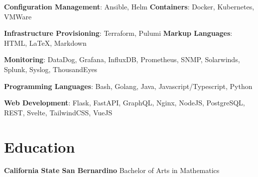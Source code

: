 \documentclass[letterpaper,11pt]{article}
\newcommand{\technicalSkill}[1]{
  \small{#1}
}
\begin{document}
  \technicalSkill{
    \textbf{Configuration Management}{: Ansible, Helm}
    \hfill
    \textbf{Containers}{: Docker, Kubernetes, VMWare}
  }

  \technicalSkill{
    \textbf{Infrastructure Provisioning}{: Terraform, Pulumi}
    \hfill
    \textbf{Markup Languages}{: HTML, {\LaTeX}, Markdown}
  }

  \technicalSkill{
    \textbf{Monitoring}{: DataDog, Grafana, InfluxDB, Prometheus, SNMP, Solarwinds, Splunk, Syslog, ThousandEyes}
  }

  \technicalSkill{
    \textbf{Programming Languages}{: Bash, Golang, Java, Javascript/Typescript, Python}
  }

  \technicalSkill{
    \textbf{Web Development}{: Flask, FastAPI, GraphQL, Nginx, NodeJS, PostgreSQL, REST, Svelte, TailwindCSS, VueJS}
  }

\section{Education}
  \technicalSkill
  {\textbf{California State San Bernardino}
  \hfill
  Bachelor of Arts in Mathematics}

\end{document}
